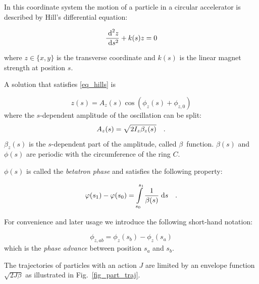 In this coordinate system the motion of a particle in a circular accelerator is described by Hill's
differential equation:

\begin{equation}
    \frac{\;\text{d}^2 z}{\;\text{d} s^2} + k(s)z = 0
    \label{eq_hills}
\end{equation}

where $z \in \{x,y\}$ is the transverse coordinate and $k(s)$ is the linear magnet strength at
position $s$.

A solution that satisfies \eqref{eq_hills} is

\begin{equation}
    z(s) = A_z(s) \cos\left(\phi_z(s) + \phi_{z,0} \right)
    \label{eq_betatron_osc}
\end{equation}
where the $s$-dependent amplitude of the oscillation can be split:
\begin{equation}
    A_z(s) = \sqrt{2I_z \beta_z(s)}
    \quad .
    \label{eq_betatron_ampl}
\end{equation}
$\beta_z(s)$ is the $s$-dependent part of the amplitude, called $\beta$~function. $\beta(s)$ and 
$\phi(s)$ are periodic with the circumference of the ring $C$.

$\phi(s)$ is called the \emph{betatron phase} and satisfies the following property:

\begin{equation}
    \varphi(s_1) - \varphi(s_0) = \int\limits_{s_0}^{s_1} \frac{1}{\beta(s)}\;\text{d} s
    \quad .
    \label{eq_phase}
\end{equation}

For convenience and later usage we introduce the following short-hand notation:

\begin{equation}
    \phi_{z,ab} = \phi_z(s_b) - \phi_z(s_a)
\end{equation}
which is the \emph{phase advance} between position $s_a$ and $s_b$.

The trajectories of particles with an action $J$ are limited by an envelope function $\sqrt{2J\beta}$
as illustrated in Fig.~\ref{fig_part_traj}.

